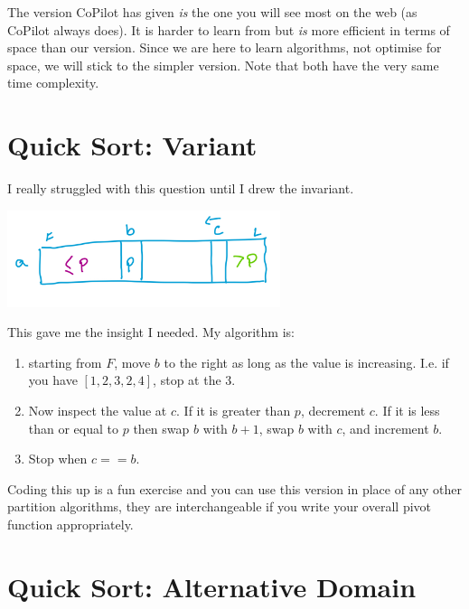 \documentclass[twoside=false,DIV=14]{scrartcl}
\begin{document}
The version CoPilot has given \emph{is} the one you will see most on the web (as CoPilot always does).  It is harder to learn from but \emph{is} more efficient in terms of space than our version. Since we are here to learn algorithms, not optimise for space, we will stick to the simpler version.  Note that both have the very same time complexity.


\section{Quick Sort: Variant}
I really struggled with this question until I drew the invariant.

\begin{center}
\includegraphics[width=0.6\textwidth]{alt_pivot_invariant.jpeg}
\end{center}

This gave me the insight I needed.  My algorithm is:
\begin{enumerate}
\item starting from $F$, move $b$ to the right as long as the value is increasing.  I.e. if you have $[1,2,3,2,4]$, stop at the $3$.
\item Now inspect the value at $c$.  If it is greater than $p$, decrement $c$.  If it is less than or equal to $p$ then swap $b$ with $b+1$, swap $b$ with $c$, and increment $b$.
\item Stop when $c == b$.
\end{enumerate}

Coding this up is a fun exercise and you can use this version in place of any other partition algorithms, they are interchangeable if you write your overall pivot function appropriately.

\section{Quick Sort: Alternative Domain}
\end{document}
